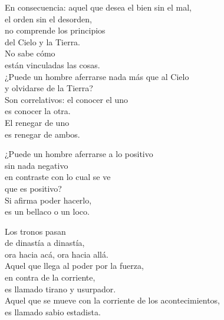 \documentclass[hidelinks]{memoir}
\begin{document}
	En consecuencia: aquel que desea el bien sin el mal,\\
	el orden sin el desorden,\\
	no comprende los principios\\
	del Cielo y la Tierra.\\
	No sabe cómo\\
	están vinculadas las cosas.\\
	¿Puede un hombre aferrarse nada más que al Cielo\\
	y olvidarse de la Tierra?\\
	Son correlativos: el conocer el uno\\
	es conocer la otra.\\
	El renegar de uno\\
	es renegar de ambos.
	
	¿Puede un hombre aferrarse a lo positivo\\
	sin nada negativo\\
	en contraste con lo cual se ve\\
	que es positivo?\\
	Si afirma poder hacerlo,\\
	es un bellaco o un loco.
	
	Los tronos pasan\\
	de dinastía a dinastía,\\
	ora hacia acá, ora hacia allá.\\
	Aquel que llega al poder por la fuerza,\\
	en contra de la corriente,\\
	es llamado tirano y usurpador.\\
	Aquel que se mueve con la corriente de los acontecimientos,\\
	es llamado sabio estadista.
	
\end{document}
